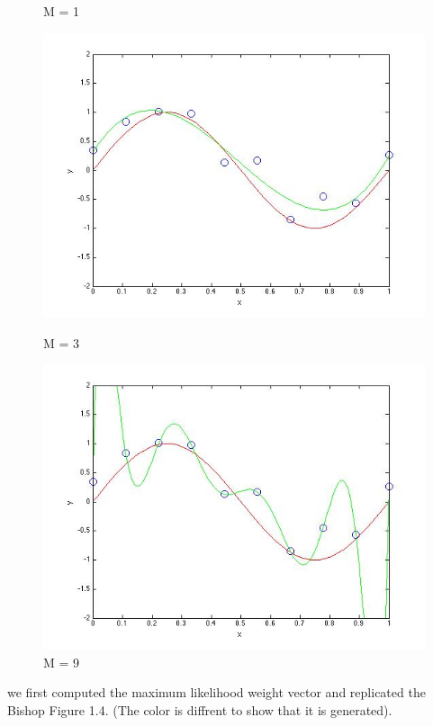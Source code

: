 \begin{figure}[!htb]
  \caption{M = 1}\label{fig:figures/p2_M=1}
\endminipage\hfill
{}                                                                            
  \includegraphics[width=\linewidth]{figures/p2_MLE_M=3}
  \caption{M = 3}\label{fig:figures/p2_M=3}
\endminipage\hfill
{}                                                                            
  \includegraphics[width=\linewidth]{figures/p2_MLE_M=9}
  \caption{M = 9}\label{fig:figures/p2_M=9}
\endminipage\hfill
\end{figure}

we first computed the maximum likelihood weight vector and replicated 
the Bishop Figure 1.4. (The color is diffrent to show that it is generated). 


